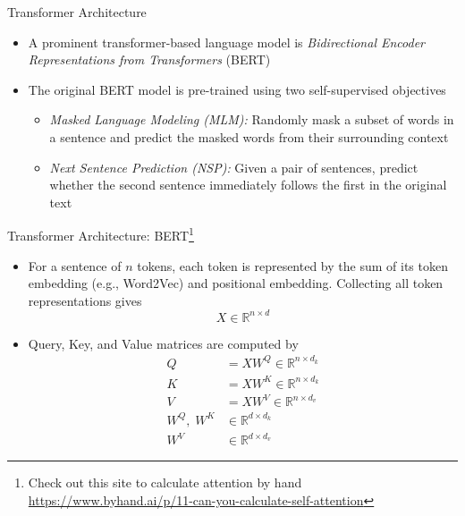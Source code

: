 \documentclass[aspectratio=1610,12pt,xcolor=dvipsnames]{beamer}
\begin{document}
\begin{frame}{Transformer Architecture}

\begin{itemize}
    \item A prominent transformer-based language model is \textit{Bidirectional Encoder Representations from Transformers} (BERT)

    \item The original BERT model is pre-trained using two self-supervised objectives

    \begin{itemize}
        \item \textit{Masked Language Modeling (MLM):} Randomly mask a subset of words in a sentence and predict the masked words from their surrounding context

        \item \textit{Next Sentence Prediction (NSP):} Given a pair of sentences, predict whether the second sentence immediately follows the first in the original text
    \end{itemize}
\end{itemize}
\end{frame}

\begin{frame}{Transformer Architecture: BERT\footnote{\scriptsize Check out this site to calculate attention by hand \url{https://www.byhand.ai/p/11-can-you-calculate-self-attention}}}

\begin{itemize}

\item For a sentence of $n$ tokens, each token is represented by the sum of its token embedding (e.g., Word2Vec) and positional embedding. Collecting all token representations gives
\[ X \in \mathds{R}^{n \times d}
\]
\item Query, Key, and Value matrices are computed by
\begin{align*}
    Q &= XW^Q \in \mathds{R}^{n \times d_k} \\
    K &= XW^K \in \mathds{R}^{n \times d_k} \\
    V &= XW^V \in \mathds{R}^{n \times d_v} \\
    W^Q,\;W^K &\in \mathds{R}^{d \times d_k} \\
    W^V &\in \mathds{R}^{d \times d_v}
\end{align*}
\end{itemize}
\end{frame}
\end{document}
